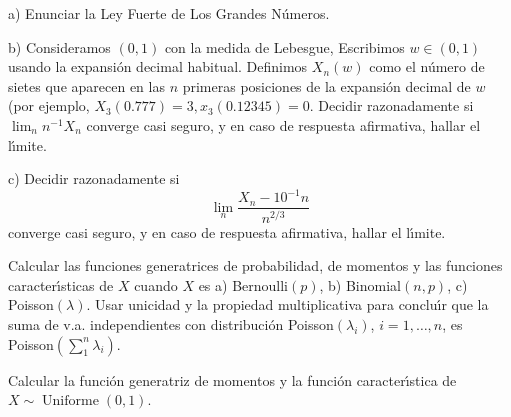 \begin{problem}[3] a) Enunciar la Ley Fuerte de Los Grandes N\'umeros.

b) Consideramos $(0,1)$ con la medida de Lebesgue, Escribimos $w\in (0,1)$ usando
la expansi\'on decimal habitual. Definimos $X_n(w)$ como el n\'umero de sietes que aparecen
en las $n$ primeras posiciones de la expansi\'on decimal de $w$ (por ejemplo, $X_3(0.777) = 3,
 x_3(0.12345) = 0$.  Decidir razonadamente si $\lim_n n^{-1}X_n$ converge casi seguro, y
 en caso de respuesta afirmativa, hallar el l\'{\i}mite.
 
 c) Decidir razonadamente si 
 $$
 \lim_n \frac{X_n - 10^{-1}n}{n^{2/3}}
 $$ 
 converge casi seguro, y
 en caso de respuesta afirmativa, hallar el l\'{\i}mite.
\solution

\begin{expla}

\end{expla}

\end{problem}


\begin{problem}[4]  Calcular las funciones generatrices de probabilidad, de momentos y las funciones caracter\'{\i}sticas de $X$ cuando $X$ es
a) Bernoulli$(p)$,
b) Binomial$(n,p)$,
c) Poisson$(\lambda)$. Usar unicidad y la propiedad multiplicativa para conclu\'{\i}r que la suma de v.a. independientes
con distribuci\'on Poisson$(\lambda_i)$, $i = 1, \dots, n$, es Poisson$(\sum_1^n \lambda_i)$.
\solution

\begin{expla}

\end{expla}

\end{problem}


\begin{problem}[5] Calcular la funci\'on generatriz de momentos y la funci\'on caracter\'{\i}stica de $X\sim \operatorname{Uniforme}(0,1)$. 
\solution

\begin{expla}

\end{expla}

\end{problem}

